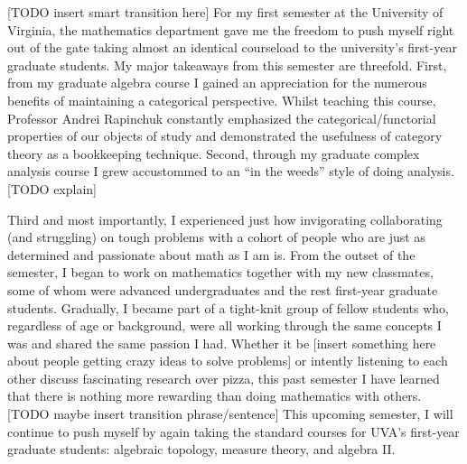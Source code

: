\documentclass[12pt]{article}
\begin{document}

[TODO insert smart transition here] For my first semester at the University of Virginia, the mathematics department gave me the freedom to push myself right out of the gate taking almost an identical courseload to the university's first-year graduate students. My major takeaways from this semester are threefold. First, from my graduate algebra course I gained an appreciation for the numerous benefits of maintaining a categorical perspective.
Whilst teaching this course, Professor Andrei Rapinchuk constantly emphasized the categorical/functorial properties of our objects of study and demonstrated the usefulness of category theory as a bookkeeping technique. Second, through my graduate complex analysis course I grew accustommed to an ``in the weeds'' style of doing analysis. [TODO explain]



Third and most importantly, I experienced just how invigorating collaborating (and struggling) on tough problems with a cohort of people who are just as determined and passionate about math as I am is. From the outset of the semester, I began to work on mathematics together with my new classmates, some of whom were advanced undergraduates and the rest first-year graduate students. Gradually, I became part of a tight-knit group of fellow students who, regardless of age or background, were all working through the same concepts I was and shared the same passion I had. Whether it be [insert something here about people getting crazy ideas to solve problems] or intently listening to each other discuss fascinating research over pizza, this past semester I have learned that there is nothing more rewarding than doing mathematics with others.
\\

[TODO maybe insert transition phrase/sentence] This upcoming semester, I will continue to push myself by again taking the standard courses for UVA's first-year graduate students: algebraic topology, measure theory, and algebra II.
\\





\end{document}
